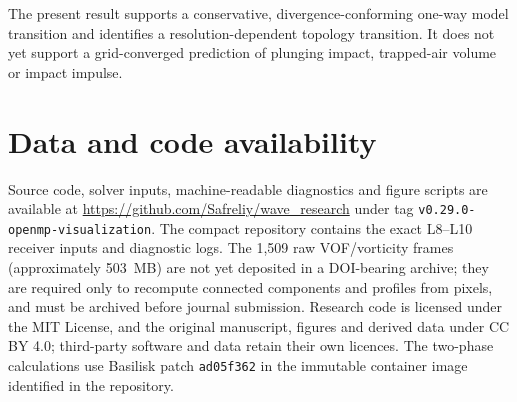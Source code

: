 \documentclass[11pt]{article}
\begin{document}
The present result supports a conservative, divergence-conforming one-way
model transition and identifies a resolution-dependent topology transition.
It does not yet
support a grid-converged prediction of plunging impact, trapped-air volume or
impact impulse.

\section*{Data and code availability}

Source code, solver inputs, machine-readable diagnostics and figure scripts
are available at \url{https://github.com/Safreliy/wave_research} under tag
\texttt{v0.29.0-openmp-visualization}.  The compact repository contains the exact
L8--L10 receiver inputs and diagnostic logs.  The 1,509 raw VOF/vorticity
frames (approximately 503~MB) are not yet deposited in a DOI-bearing archive;
they are required only to recompute connected components and profiles from
pixels, and must be archived before journal submission.  Research code is
licensed under the MIT License, and the original manuscript, figures and
derived data under CC BY 4.0; third-party software and data retain their own
licences.  The two-phase calculations use Basilisk patch \texttt{ad05f362}
in the immutable container image identified in the repository.


{\footnotesize}
\end{document}
